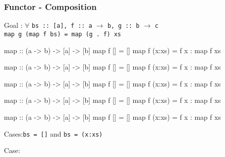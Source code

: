 \documentclass{beamer}
\newcommand{\ca}[1]{{\color{blue}#1}}
\newcommand{\cb}[1]{{\color{violet}#1}}
\newcommand{\cc}[1]{{\color{red}#1}}
\newcommand{\ce}[1]{{\color{green!50!black}#1}}
\begin{document}
\begin{frame}[t,fragile]
    \frametitle {Functor - Composition}

\begingroup
\color{gray}\fontsize{10}{9.8}\selectfont

Goal : $\forall$ \verb?bs :: [a], f :: a? $\rightarrow$ \verb?b, g :: b? $\rightarrow$ \verb?c? \\ 
    \quad \alert<3,21>{\Verb?map g (map f bs) = map (g . f) xs?}

\vspace{10pt}

\begin{overprint}

\begin{semiverbatim}
map :: (a -> b) -> [a] -> [b]
map f [] = []
map f (x:xs) = f x : map f xs
\end{semiverbatim}

\begin{semiverbatim}
map :: (a -> b) -> [a] -> [b]
map \ca{f} \cb{[]} = []
map f (x:xs) = f x : map f xs
\end{semiverbatim}

\begin{semiverbatim}
map :: (a -> b) -> [a] -> [b]
map \ca{f} \cb{[]} = \cb{[]}
map f (x:xs) = f x : map f xs
\end{semiverbatim}

\begin{semiverbatim}
map :: (a -> b) -> [a] -> [b]
map f [] = []
map \ca{f} (\cb{x}:\cc{xs}) = f x : map f xs
\end{semiverbatim}

\begin{semiverbatim}
map :: (a -> b) -> [a] -> [b]
map f [] = []
map \ca{f} (\cb{x}:\cc{xs}) = \ca{f} \cb{x} : map \ca{f} \cc{xs}
\end{semiverbatim}

\end{overprint}

\endgroup

\vspace{10pt}

\begin{overprint}

Cases:\quad\Verb?bs = []? \quad and \Verb?bs = (x:xs)?

Case:\quad{\ce{\Verb?bs = ?\alert<4>{\Verb?[]?}}} 


\end{overprint}
\end{frame}
\end{document}
